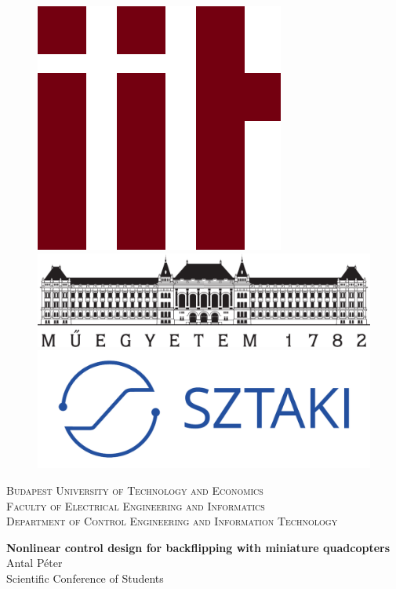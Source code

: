 \thispagestyle{empty}
\begin{figure}
\centering
\begin{minipage}{0.2\textwidth}
		\includegraphics[width=.5\linewidth]{Fig/logo.png}

\end{minipage}
\begin{minipage}{0.55\textwidth}
		\includegraphics[width=.9\linewidth]{Fig/bme_logo_nagy.pdf}
\end{minipage}
\begin{minipage}{0.2\textwidth}
		\includegraphics[width=\linewidth]{Fig/sztaki_logo_2019_uj_kek.pdf}
\end{minipage}		
\end{figure}
\begin{center}
{\textsc{Budapest University of Technology and Economics\\Faculty of Electrical Engineering and Informatics\\Department of Control Engineering and Information Technology}}


{\Large\textbf{Nonlinear control design for backflipping with miniature quadcopters\\}}
{\Large{Antal Péter\\}}
{\large{Scientific Conference of Students\\}}
\end{center}
